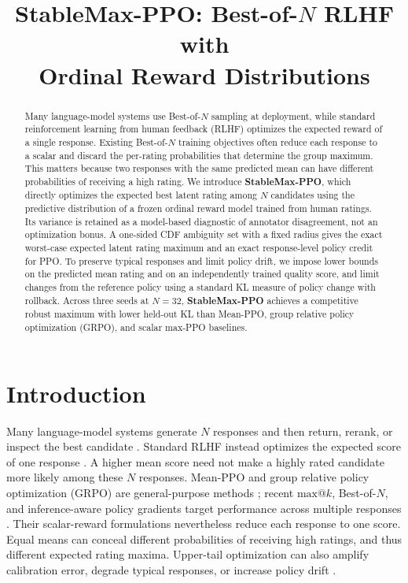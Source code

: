 \documentclass{article}
\title{StableMax-PPO: Best-of-\(N\) RLHF with\protect\\Ordinal Reward Distributions}
\author{}
\date{}
\newcommand{\method}{StableMax-PPO}
\theoremstyle{definition}
\theoremstyle{remark}
\begin{document}
\maketitle

\begin{abstract}
Many language-model systems use Best-of-\(N\) sampling at deployment,
while standard reinforcement learning from human feedback (RLHF) optimizes
the expected reward of a single response. Existing Best-of-\(N\) training
objectives often reduce each response to a scalar and discard the
per-rating probabilities that determine the group maximum. This matters
because two responses with the same predicted mean can have different
probabilities of receiving a high rating. We introduce \textbf{\method{}},
which directly optimizes the expected best latent rating among \(N\)
candidates using the predictive distribution of a frozen ordinal reward
model trained from human ratings. Its variance is retained as a model-based
diagnostic of annotator disagreement, not an optimization bonus. A one-sided
CDF ambiguity set with a fixed radius gives the exact worst-case expected
latent rating maximum and an exact response-level policy credit for PPO. To
preserve typical responses and limit policy drift, we impose lower bounds on
the predicted mean rating and on an independently trained quality score, and
limit changes from the reference policy using a standard KL measure of policy
change with rollback. Across three seeds at \(N=32\), \textbf{\method{}}
achieves a competitive robust maximum with lower held-out KL than Mean-PPO,
group relative policy optimization (GRPO), and scalar max-PPO baselines.
\end{abstract}
\section{Introduction}
\label{sec:introduction}

Many language-model systems generate \(N\) responses and then return, rerank,
or inspect the best candidate \citep{nakano2021webgpt,cobbe2021training}.
Standard RLHF instead optimizes the expected score of one response
\citep{christiano2017deep,stiennon2020learning,ouyang2022training}.
A higher mean score need not make a highly rated candidate more likely among
these \(N\) responses. Mean-PPO and group relative policy optimization (GRPO) are
general-purpose methods \citep{shao2024deepseekmath,guo2025deepseekr1}; recent
$\mathrm{max}@k$, Best-of-\(N\), and inference-aware policy gradients target
performance across multiple responses \citep{chow2025inference,tang2025inference,
walder2025pkpo,bagirov2025best,li2026posttraining,poiani2026maxk}.
Their scalar-reward formulations nevertheless reduce each response to one
score. Equal means can conceal different probabilities of receiving high
ratings, and thus different expected rating maxima.
Upper-tail optimization can also amplify calibration error, degrade typical
responses, or increase policy drift
\citep{gao2023scaling,kirk2024understanding}.
\end{document}
